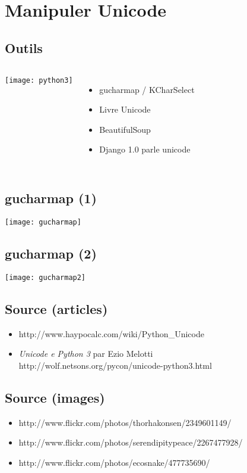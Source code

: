 \section{Manipuler Unicode}

\subsection{Outils}
\frame
{
    \begin{columns}[c]
            \texttt{[image: python3]}
            \begin{itemize}
            \item gucharmap / KCharSelect
            \item Livre Unicode
            \item BeautifulSoup
            \item Django 1.0 parle unicode
            \end{itemize}
    \end{columns}
}

\subsection{gucharmap (1)}
\frame
{
    \begin{center}
        \texttt{[image: gucharmap]}
    \end{center}
}

\subsection{gucharmap (2)}
\frame
{
    \begin{center}
        \texttt{[image: gucharmap2]}
    \end{center}
}

\subsection*{Source (articles)}
\frame
{
    \begin{itemize}
    \item http://www.haypocalc.com/wiki/Python\_Unicode
    \item \textit{Unicode e Python 3} par Ezio Melotti \\
    http://wolf.netsons.org/pycon/unicode-python3.html
    \end{itemize}
}

\subsection*{Source (images)}
\frame
{
    \begin{itemize}
    \item http://www.flickr.com/photos/thorhakonsen/2349601149/
    \item http://www.flickr.com/photos/serendipitypeace/2267477928/
    \item http://www.flickr.com/photos/ecosnake/477735690/
    \end{itemize}
}

